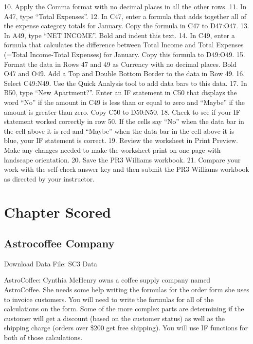 10. Apply the Comma format with no decimal places in all the other rows.
11. In A47, type “Total Expenses”.
12. In C47, enter a formula that adds together all of the expense category totals for January. Copy
the formula in C47 to D47:O47.
13. In A49, type “NET INCOME”. Bold and indent this text.
14. In C49, enter a formula that calculates the difference between Total Income and Total Expenses
(=Total Income-Total Expenses) for January. Copy this formula to D49:O49.
15. Format the data in Rows 47 and 49 as Currency with no decimal places. Bold O47 and O49. Add
a Top and Double Bottom Border to the data in Row 49.
16. Select C49:N49. Use the Quick Analysis tool to add data bars to this data.
17. In B50, type “New Apartment?”. Enter an IF statement in C50 that displays the word “No” if the
amount in C49 is less than or equal to zero and “Maybe” if the amount is greater than zero.
Copy C50 to D50:N50.
18. Check to see if your IF statement worked correctly in row 50. If the cells say “No” when the data
bar in the cell above it is red and “Maybe” when the data bar in the cell above it is blue, your IF
statement is correct.
19. Review the worksheet in Print Preview. Make any changes needed to make the worksheet print
on one page with landscape orientation.
20. Save the PR3 Williams workbook.
21. Compare your work with the self-check answer key and then submit the PR3 Williams
workbook as directed by your instructor.




\section{Chapter Scored}




\subsection{Astrocoffee Company}

Download Data File: SC3 Data

AstroCoffee: Cynthia McHenry owns a coffee supply company named AstroCoffee. She needs some
help writing the formulas for the order form she uses to invoice customers. You will need to write the
formulas for all of the calculations on the form. Some of the more complex parts are determining if
the customer will get a discount (based on the customer status) as well as the shipping charge (orders
over \$200 get free shipping). You will use IF functions for both of those calculations.

